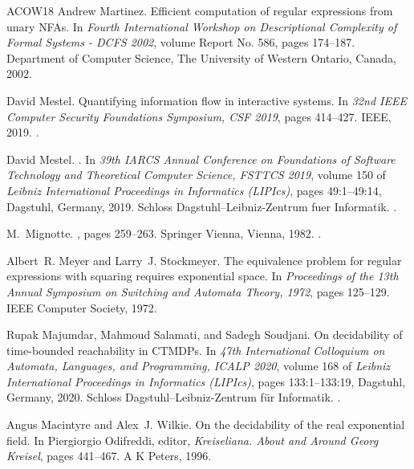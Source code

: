 \documentclass[10pt,a4paper]{amsart}
\numberwithin{equation}{section}
\theoremstyle{plain}
\theoremstyle{definition}
\theoremstyle{remark}
\begin{document}
\begin{thebibliography}{ACOW18}
Andrew Martinez.
\newblock Efficient computation of regular expressions from unary {NFA}s.
\newblock In {\em Fourth International Workshop on Descriptional Complexity of
  Formal Systems - {DCFS} 2002}, volume Report No. 586, pages 174--187.
  Department of Computer Science, The University of Western Ontario, Canada,
  2002.

David Mestel.
\newblock Quantifying information flow in interactive systems.
\newblock In {\em 32nd {IEEE} Computer Security Foundations Symposium, {CSF}
  2019}, pages 414--427. {IEEE}, 2019.
\newblock \href {https://doi.org/10.1109/CSF.2019.00035}
  {}.

David Mestel.
.
\newblock In {\em 39th IARCS Annual Conference on Foundations of Software
  Technology and Theoretical Computer Science, {FSTTCS} 2019}, volume 150 of
  {\em Leibniz International Proceedings in Informatics (LIPIcs)}, pages
  49:1--49:14, Dagstuhl, Germany, 2019. Schloss Dagstuhl--Leibniz-Zentrum fuer
  Informatik.
\newblock \href {https://doi.org/10.4230/LIPIcs.FSTTCS.2019.49}
  {}.

M.~Mignotte.
, pages 259--263.
\newblock Springer Vienna, Vienna, 1982.
\newblock \href {https://doi.org/10.1007/978-3-7091-3406-1_16}
  {}.

Albert~R. Meyer and Larry~J. Stockmeyer.
\newblock The equivalence problem for regular expressions with squaring
  requires exponential space.
\newblock In {\em Proceedings of the 13th Annual Symposium on Switching and
  Automata Theory, 1972}, pages 125--129. {IEEE} Computer Society, 1972.

Rupak Majumdar, Mahmoud Salamati, and Sadegh Soudjani.
\newblock On decidability of time-bounded reachability in {CTMDPs}.
\newblock In {\em 47th International Colloquium on Automata, Languages, and
  Programming, {ICALP} 2020}, volume 168 of {\em Leibniz International
  Proceedings in Informatics (LIPIcs)}, pages 133:1--133:19, Dagstuhl, Germany,
  2020. Schloss Dagstuhl--Leibniz-Zentrum f{\"u}r Informatik.
\newblock \href {https://doi.org/10.4230/LIPIcs.ICALP.2020.133}
  {}.

Angus Macintyre and Alex~J. Wilkie.
\newblock On the decidability of the real exponential field.
\newblock In Piergiorgio Odifreddi, editor, {\em Kreiseliana. About and Around
  Georg Kreisel}, pages 441--467. A K Peters, 1996.


\end{thebibliography}
\end{document}
